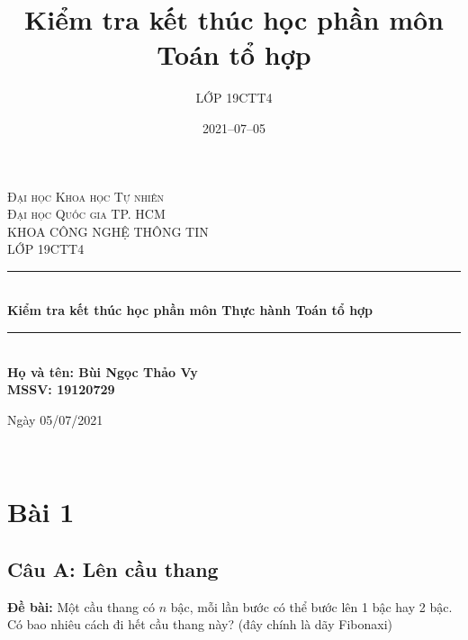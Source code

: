 \documentclass[12pt]{article}
\title{Kiểm tra kết thúc học phần môn Toán tổ hợp}
\author{LỚP 19CTT4}
\date{2021–07–05}
\begin{document}
\begin{sloppypar}

\begin{titlepage}
    
    \newcommand{\HRule}{\rule{\linewidth}{0.5mm}} %
    
    \center %
    \vspace*{\fill}
     
    \textsc{\LARGE Đại học Khoa học Tự nhiên}\\[0.2cm]
    \textsc{\large Đại học Quốc gia TP. HCM }\\[1.5cm] 
    \textsc{\Large KHOA CÔNG NGHỆ THÔNG TIN}\\[0.2cm] 
    \textsc{\large LỚP 19CTT4 }\\[0.5cm]
    \HRule \\[0.4cm]
    { \huge \bfseries Kiểm tra kết thúc học phần môn\break 
    Thực hành Toán tổ hợp}\\[0.4cm] %
    \HRule \\[1.5cm]
    \LARGE \textbf {Họ và tên: Bùi Ngọc Thảo Vy \\}
    \LARGE \textbf {MSSV: 19120729 \\}
    
    \begin{minipage}{1\textwidth}
    \begin{center}
        \LARGE Ngày 05/07/2021
    \end{center}
    \end{minipage}\\[2cm]
    \vspace*{\fill} %
    \end{titlepage}


    \renewcommand*\contentsname{\begin{center} \LARGE Mục lục \end{center}}
    \tableofcontents
    \pagebreak
\section{Bài 1}
\subsection{Câu A: Lên cầu thang}

\begin{tcolorbox}
    \textbf{Đề bài:} Một cầu thang có \(n\) bậc, mỗi lần bước có thể bước lên 1 bậc hay 2 bậc. Có bao nhiêu cách đi hết cầu thang này? (đây chính là dãy Fibonaxi)
\end{tcolorbox}


\end{sloppypar}
\end{document}
